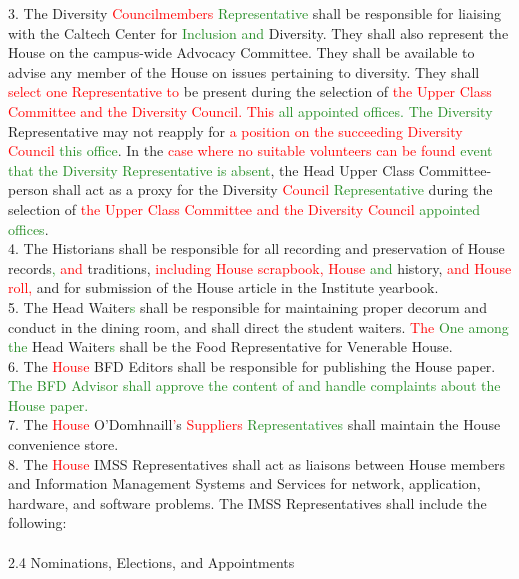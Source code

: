 \documentclass[10pt]{article} %
\newcommand{\add}[1]{\textcolor{ForestGreen}{#1}} %
\newcommand{\del}[1]{\textcolor{red}{#1}} %
\newcommand{\swap}[2]{\del{#1} \add{#2}} %
\begin{document}
\begin{itemize}
		3. The Diversity \swap{Councilmembers}{Representative} shall be responsible for liaising with the Caltech Center for \add{Inclusion and} Diversity. They shall also represent the House on the campus-wide Advocacy Committee. They shall be available to advise any member of the House on issues pertaining to diversity. They shall \del{select one Representative to} be present during the selection of \swap{the Upper Class Committee and the Diversity Council. This}{all appointed offices. The Diversity} Representative may not reapply for \swap{a position on the succeeding Diversity Council}{this office}. In the \swap{case where no suitable volunteers can be found}{event that the Diversity Representative is absent}, the Head Upper Class Committee-person shall act as a proxy for the Diversity \swap{Council}{Representative} during the selection of \swap{the Upper Class Committee and the Diversity Council}{appointed offices}. \\
        4. The Historians shall be responsible for all recording and preservation of House records\add{,} \del{and} traditions, \del{including House scrapbook, House} \add{and} history, \del{and House roll,} and for submission of the House article in the Institute yearbook. \\
        5. The Head Waiter\add{s} shall be responsible for maintaining proper decorum and conduct in the dining room, and shall direct the student waiters. \swap{The}{One among the} Head Waiter\add{s} shall be the Food Representative for Venerable House. \\
        6. The \del{House} BFD Editors shall be responsible for publishing the House paper. \add{The BFD Advisor shall approve the content of and handle complaints about the House paper.} \\
        7. The \del{House} O'Domhnaill\del{'}s \swap{Suppliers}{Representatives} shall maintain the House convenience store. \\
        8. The \del{House} IMSS Representatives shall act as liaisons between House members and Information Management Systems and Services for network, application, hardware, and software problems. The IMSS Representatives shall include the following: \\ \\
        2.4 Nominations, Elections, and Appointments \\

\end{itemize}
\end{document}
